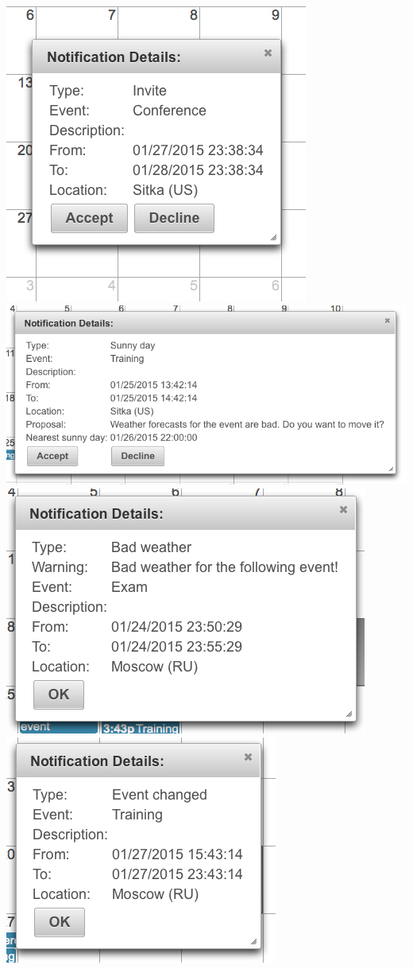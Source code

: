\documentclass[10pt,a4paper,titlepage]{article}
\begin{document}
\begin{center}
\includegraphics[width=0.7\linewidth]{./images/25_notification_invite}\vspace{10pt}
\includegraphics[width=0.7\linewidth]{./images/26_sunny_day_proposal}\vspace{10pt}
\includegraphics[width=0.7\linewidth]{./images/27_bad_weather_alert}\vspace{10pt}
\includegraphics[width=0.7\linewidth]{./images/28_event_changed_notification}
\end{center}
\end{document}
